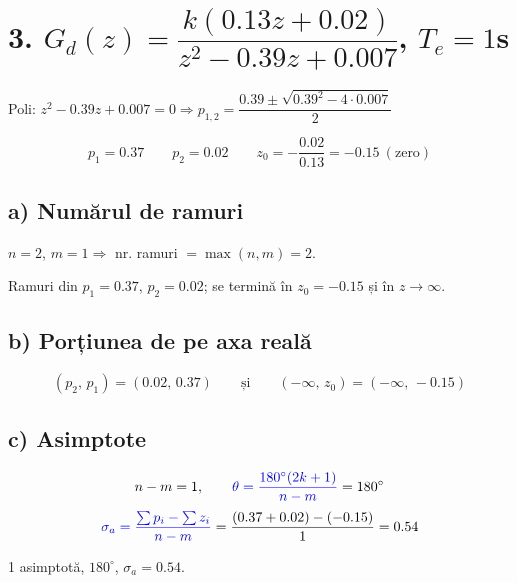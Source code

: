 \documentclass[10pt,a4paper]{article}
\begin{document}
\begin{center}
\end{center}

\section*{3. $G_d(z)=\dfrac{k(0.13z+0.02)}{z^2-0.39z+0.007}$, $T_e=1$s}
Poli: $z^2-0.39z+0.007=0\Rightarrow p_{1,2}=\dfrac{0.39\pm\sqrt{0.39^2-4\cdot0.007}}{2}$
\begin{res}
$$p_1=0.37\qquad p_2=0.02\qquad z_0=-\frac{0.02}{0.13}=-0.15\ (\text{zero})$$
\end{res}

\subsection*{a) Numărul de ramuri}
$n=2$, $m=1\Rightarrow$ nr. ramuri $=\max(n,m)=2$.
\begin{res}
Ramuri din $p_1=0.37$, $p_2=0.02$; se termină în $z_0=-0.15$ și în $z\to\infty$.
\end{res}

\subsection*{b) Porțiunea de pe axa reală}
\begin{res}
$$(p_2,\,p_1)=(0.02,\,0.37)\qquad\text{și}\qquad(-\infty,\,z_0)=(-\infty,\,-0.15)$$
\end{res}

\subsection*{c) Asimptote}
$$n-m=1,\qquad \textcolor{blue}{\theta=\frac{180^\circ(2k+1)}{n-m}}=180^\circ$$
$$\textcolor{blue}{\sigma_a=\frac{\sum p_i-\sum z_i}{n-m}}=\frac{(0.37+0.02)-(-0.15)}{1}=0.54$$
\begin{res}
1 asimptotă, $180^\circ$, $\sigma_a=0.54$.
\end{res}
\end{document}
